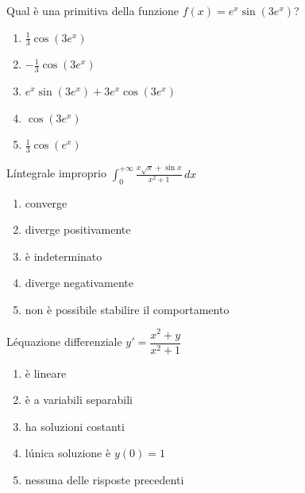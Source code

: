 \begin{quiz}
Qual \`e una primitiva della funzione $f(x)=e^x\sin(3e^x)$?
\begin{enumerate}
\item $\frac13\cos(3e^x)$
\item $-\frac13\cos(3e^x)$
\item $e^x\sin(3e^x)+3e^x\cos(3e^x)$
\item $\cos(3e^x)$
\item $\frac13\cos(e^x)$
\end{enumerate}
\end{quiz}

\begin{quiz}
L\'integrale improprio $\displaystyle\int_0^{+\infty}\frac{x\sqrt{x}+\sin x}{x^2+1}\,dx$
\begin{enumerate}
\item converge
\item diverge positivamente
\item \`e indeterminato
\item diverge negativamente
\item non \`e possibile stabilire il comportamento
\end{enumerate}
\end{quiz}

\begin{quiz}
L\'equazione differenziale $y\prime=\dfrac{x^2+y}{x^2+1}$
\begin{enumerate}
\item \`e lineare
\item \`e a variabili separabili
\item ha soluzioni costanti
\item l\'unica soluzione \`e $y(0)=1$
\item nessuna delle risposte precedenti
\end{enumerate}
\end{quiz}

